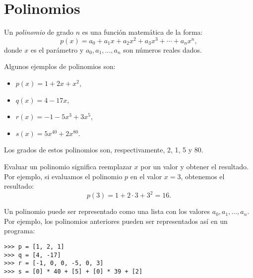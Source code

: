\section{Polinomios}

Un \emph{polinomio} de grado \(n\)
es una función matemática de la forma:
\[
  p(x) = a_0 + a_1 x + a_2 x^2 + a_3 x^3 + \cdots + a_n x^n,
\]
donde \(x\) es el parámetro y \(a_0, a_1, \dots, a_n\) son números reales
dados.

Algunos ejemplos de polinomios son:
\begin{itemize}
 \item \(p(x) = 1 + 2x + x^2\),
 \item \(q(x) = 4 - 17x\),
 \item \(r(x) = -1 - 5x^3 + 3x^5\),
 \item \(s(x) = 5x^{40} + 2x^{80}\).
\end{itemize}
Los grados de estos polinomios son, respectivamente, 2, 1, 5 y 80.

Evaluar un polinomio significa reemplazar \(x\) por un valor y obtener el
resultado. Por ejemplo, si evaluamos el polinomio \(p\) en el valor
\(x = 3\), obtenemos el resultado:
\[
  p(3) = 1 + 2\cdot 3 + 3^2 = 16.
\]

Un polinomio puede ser representado como una lista con los valores
\(a_0, a_1, \dots, a_n\). Por ejemplo, los polinomios anteriores pueden
ser representados así en un programa:
\begin{lstlisting}
>>> p = [1, 2, 1]
>>> q = [4, -17]
>>> r = [-1, 0, 0, -5, 0, 3]
>>> s = [0] * 40 + [5] + [0] * 39 + [2]
\end{lstlisting}

